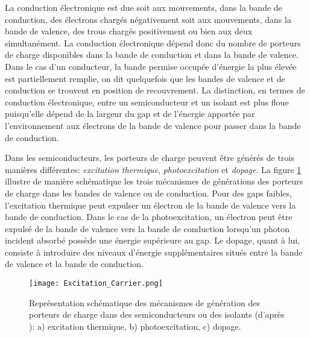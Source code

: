 \begin{refsection}
    La conduction électronique est due soit aux mouvements, dans la bande de
    conduction, des électrons chargés négativement soit aux mouvements, dans la bande de valence, des trous chargés
    positivement ou bien aux deux simultanément. La conduction électronique dépend donc du nombre de porteurs de charge
    disponibles dans la bande de conduction et dans la bande de valence. 
    Dans le cas d'un conducteur, la bande permise occupée d'énergie la plus élevée est partiellement remplie, on dit
    quelquefois que les bandes de valence et de conduction se trouvent en position de recouvrement.
    La distinction, en termes de conduction électronique, entre un semiconducteur et un isolant est plus floue puisqu'elle 
    dépend de la largeur du gap et de l'énergie apportée par l'environnement aux électrons de la bande de valence pour
    passer dans la bande de conduction. 
    
    Dans les semiconducteurs, les porteurs de charge peuvent être générés de trois manières différentes:
    \emph{excitation thermique}, \emph{photoexcitation} et \emph{dopage}. La figure \ref{fig:excitation_carrier} illustre
    de manière schématique les trois mécanismes de générations des porteurs de charge dans les bandes de valence ou de
    conduction. Pour des gaps faibles,
    l'excitation thermique peut expulser un électron de la bande de valence vers la bande de conduction. Dans le cas de la
    photoexcitation, un électron peut être expulsé de la bande de valence vers la bande de conduction lorsqu'un photon
    incident absorbé possède une énergie supérieure au gap. Le dopage, quant à lui, consiste à introduire des niveaux d'énergie
    supplémentaires situés entre la bande de valence et la bande de conduction.

    \begin{figure}[H]
        \centering
        \texttt{[image: Excitation\_Carrier.png]}
        \caption[Représentation schématique des mécanismes de génération des porteurs de charge dans des
        semiconducteurs ou des isolants:
        a) excitation thermique,
        b) photoexcitation,
        c) dopage.]
        {Représentation schématique des mécanismes de génération des porteurs de charge dans des
            semiconducteurs ou des isolants (d'après \citet{Finklea1983}):
        a) excitation thermique,
        b) photoexcitation,
        c) dopage.}
        \label{fig:excitation_carrier}
    \end{figure}


\end{refsection}
